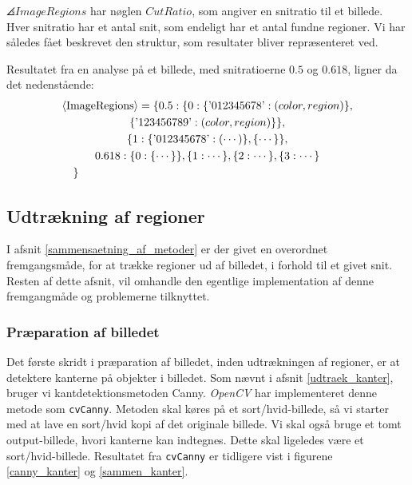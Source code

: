 {\noindent $\angles{ImageRegions}$ har nøglen $CutRatio$, som angiver en
snitratio til et billede. Hver snitratio har et antal snit, som endeligt
har et antal fundne regioner. Vi har således fået beskrevet den
struktur, som resultater bliver repræsenteret ved.

Resultatet fra en analyse på et billede, med snitratioerne $0.5$ og
$0.618$, ligner da det nedenstående:
\begin{multline}
    \angles{ImageRegions} = \{ 0.5 : \{ 0 : \{ \textrm{'012345678'} : (color, region) \},\\
                                            \{ \textrm{'123456789'} : (color, region) \}
                                            \},\\
                                            \{ 1 : \{ \textrm{'012345678'} : ( \cdots ) \}, 
                                            \{ \cdots \} \}, \\
                              0.618 : \{ 0 : \{ \cdots \} \}, \{ 1 :
                              \cdots \}, \{ 2 : \cdots \}, \{ 3 : \cdots
                              \} \\
    \shoveleft{\}}\shoveright{}
    \label{CutRegions_dict}
\end{multline}

\subsection{Udtrækning af regioner}
I afsnit \ref{sammensaetning_af_metoder} er der givet en overordnet
fremgangsmåde, for at trække regioner ud af billedet, i forhold til et
givet snit. Resten af dette afsnit, vil omhandle den egentlige
implementation af denne fremgangmåde og problemerne tilknyttet.

\subsubsection{Præparation af billedet}
Det første skridt i præparation af billedet, inden udtrækningen af
regioner, er at detektere kanterne på objekter i billedet.  Som nævnt i
afsnit \ref{udtraek_kanter}, bruger vi kantdetektionsmetoden Canny.
\emph{OpenCV} har implementeret denne metode som \texttt{cvCanny}.
Metoden skal køres på et sort/hvid-billede, så vi starter med at lave en
sort/hvid kopi af det originale billede. Vi skal også bruge et tomt
output-billede, hvori kanterne kan indtegnes. Dette skal ligeledes være
et sort/hvid-billede. Resultatet fra \texttt{cvCanny} er tidligere vist
i figurene \ref{canny_kanter} og \ref{sammen_kanter}.

}
